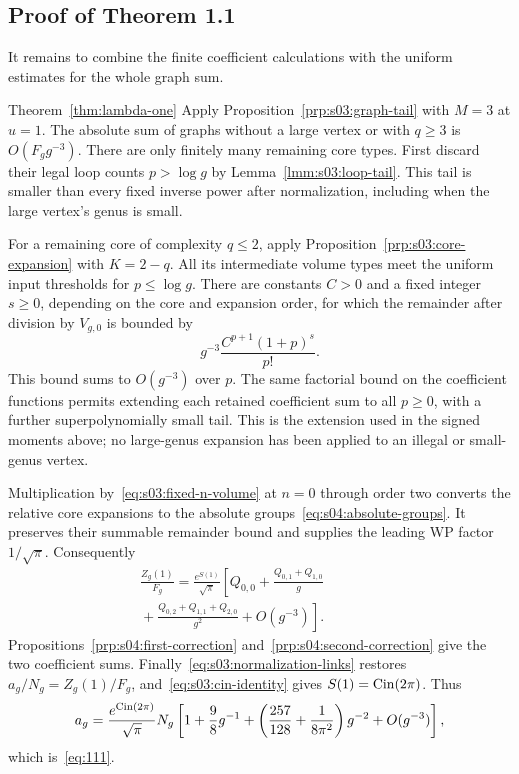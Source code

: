 \subsection{Proof of Theorem 1.1}
\label{subsec:s04:04}

It remains to combine the finite coefficient calculations with the
uniform estimates for the whole graph sum.

\begin{prfn}{Theorem~\ref{thm:lambda-one}}
Apply Proposition~\ref{prp:s03:graph-tail} with $M=3$ at $u=1$.
The absolute sum of graphs without a large vertex or with $q\geq3$
is $O(F_g g^{-3})$. There are only finitely many remaining core
types. First discard their legal loop counts $p>\log g$ by
Lemma~\ref{lmm:s03:loop-tail}. This tail is smaller than every fixed
inverse power after normalization, including when the large vertex's
genus is small.

For a remaining core of complexity $q\leq2$, apply
Proposition~\ref{prp:s03:core-expansion} with $K=2-q$.
All its intermediate volume types meet the uniform input thresholds
for $p\leq\log g$. There are constants $C>0$ and a fixed integer
$s\geq0$, depending on the core and expansion order, for which the
remainder after division by $V_{g,0}$ is bounded by
\[
 g^{-3}\frac{C^{p+1}(1+p)^s}{p!}.
\]
This bound sums to $O(g^{-3})$ over $p$.
The same factorial bound on the coefficient functions permits
extending each retained coefficient sum to all $p\geq0$, with a
further superpolynomially small tail. This is the extension used in
the signed moments above; no large-genus expansion has been applied
to an illegal or small-genus vertex.

Multiplication by~\eqref{eq:s03:fixed-n-volume} at $n=0$ through
order two converts the relative core expansions to the absolute
groups~\eqref{eq:s04:absolute-groups}. It preserves their summable
remainder bound and supplies the leading WP factor $1/\sqrt\pi$.
Consequently
\begin{align*}
 \frac{Z_g(1)}{F_g}=\frac{e^{S(1)}}{\sqrt\pi}
 \left[Q_{0,0}+\frac{Q_{0,1}+Q_{1,0}}g\right.\qquad\qquad\\
 \left.{}+\frac{Q_{0,2}+Q_{1,1}+Q_{2,0}}{g^2}
                  +O(g^{-3})\right].
\end{align*}
Propositions~\ref{prp:s04:first-correction}
and~\ref{prp:s04:second-correction} give the two coefficient sums.
Finally~\eqref{eq:s03:normalization-links} restores
$a_g/N_g=Z_g(1)/F_g$, and~\eqref{eq:s03:cin-identity} gives
$S(1)=\operatorname{\mathrm{Cin}}(2\pi)$. Thus
\[
 a_g=\frac{e^{\operatorname{\mathrm{Cin}}(2\pi)}}{\sqrt\pi}N_g
 \left[1+\frac{9}{8}g^{-1}
     +\left(\frac{257}{128}+\frac1{8\pi^2}\right)g^{-2}
     +O(g^{-3})\right],
\]
which is~\eqref{eq:111}.
\end{prfn}

